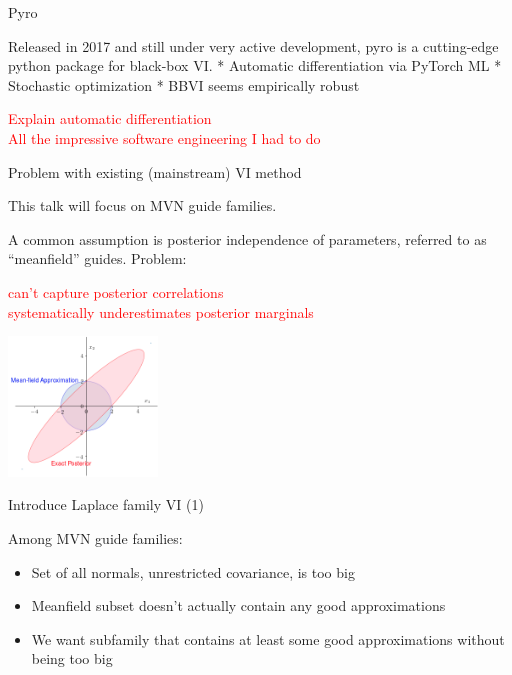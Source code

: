 \documentclass[
  ignorenonframetext,
]{beamer}
\providecommand{\tightlist}{%
  \setlength{\itemsep}{0pt}\setlength{\parskip}{0pt}}
\begin{document}
\begin{frame}{Pyro}
\protect\hypertarget{pyro}{}

Released in 2017 and still under very active development, pyro is a
cutting-edge python package for black-box VI. * Automatic
differentiation via PyTorch ML * Stochastic optimization * BBVI seems
empirically robust

\textcolor{red}{{\scriptsize Explain automatic differentiation\\All the impressive software engineering I had to do}}

\end{frame}

\begin{frame}{Problem with existing (mainstream) VI method}
\protect\hypertarget{problem-with-existing-mainstream-vi-method}{}

This talk will focus on MVN guide families.

A common assumption is posterior independence of parameters, referred to
as ``meanfield'' guides. Problem:

\textcolor{red}{{\scriptsize can’t capture posterior correlations\\systematically underestimates posterior marginals}}

\begin{center}\includegraphics[width=150px]{meanfield_covar_figure} \end{center}

\end{frame}

\begin{frame}{Introduce Laplace family VI (1)}
\protect\hypertarget{introduce-laplace-family-vi-1}{}

Among MVN guide families:

\begin{itemize}
\tightlist
\item
  Set of all normals, unrestricted covariance, is too big
\item
  Meanfield subset doesn't actually contain any good approximations
\item
  We want subfamily that contains at least some good approximations
  without being too big
\end{itemize}

\end{frame}
\end{document}
